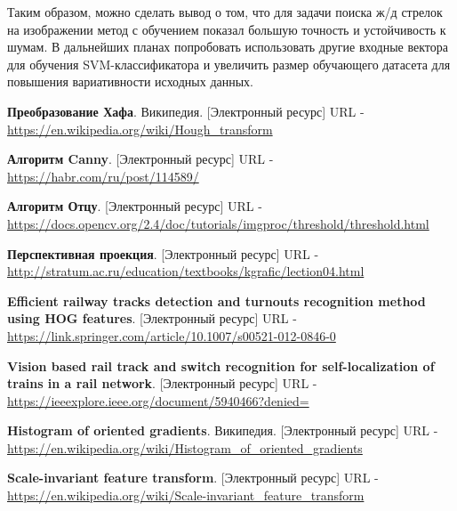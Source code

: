 Таким образом, можно сделать вывод о том, что для задачи поиска ж/д стрелок на изображении метод с обучением показал большую точность и устойчивость к шумам. В дальнейших планах попробовать использовать другие входные вектора для обучения SVM-классификатора и увеличить размер обучающего датасета для повышения вариативности исходных данных.

\newpage
\begin{thebibliography}{2}
	\textbf{Преобразование Хафа}. Википедия. [Электронный ресурс] URL - 
	\href{https://en.wikipedia.org/wiki/Hough\_transform}{https://en.wikipedia.org/wiki/Hough\_transform}
	
	\textbf{Алгоритм Canny}. [Электронный ресурс] URL - 
	\href{https://habr.com/ru/post/114589/}{https://habr.com/ru/post/114589/}
	
	\textbf{Алгоритм Отцу}. [Электронный ресурс] URL - 
	\href{https://docs.opencv.org/2.4/doc/tutorials/imgproc/threshold/threshold.html}{https://docs.opencv.org/2.4/doc/tutorials/imgproc/threshold/threshold.html}
	
	\textbf{Перспективная проекция}. [Электронный ресурс] URL - 
	\href{http://stratum.ac.ru/education/textbooks/kgrafic/lection04.html}{http://stratum.ac.ru/education/textbooks/kgrafic/lection04.html}
	
	\textbf{Efficient railway tracks detection and turnouts recognition method using HOG features}. [Электронный ресурс] URL - 
	\href{https://link.springer.com/article/10.1007/s00521-012-0846-0}{https://link.springer.com/article/10.1007/s00521-012-0846-0}
	
	\textbf{Vision based rail track and switch recognition for self-localization of trains in a rail network}. [Электронный ресурс] URL - 
	\href{https://ieeexplore.ieee.org/document/5940466?denied=}{https://ieeexplore.ieee.org/document/5940466?denied=}
	
	\textbf{Histogram of oriented gradients}. Википедия. [Электронный ресурс] URL - 
	\href{https://en.wikipedia.org/wiki/Histogram_of_oriented_gradients}{https://en.wikipedia.org/wiki/Histogram\_of\_oriented\_gradients}
	
	\textbf{Scale-invariant feature transform}. [Электронный ресурс] URL - 
	\href{https://en.wikipedia.org/wiki/Scale-invariant_feature_transform}{https://en.wikipedia.org/wiki/Scale-invariant\_feature\_transform}
	

\end{thebibliography}
